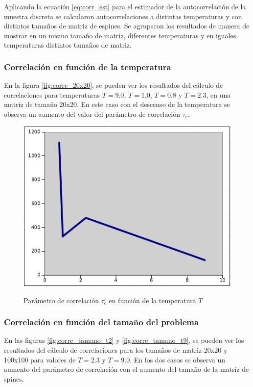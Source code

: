 \documentclass[a4paper,12pt]{article}
\begin{document}
Aplicando la ecuación  \ref{eq:corr_est}  para el estimador de la 
autocorrelación de la muestra discreta
se calcularon autocorrelaciones a distintas temperaturas y con distintos 
tamaños 
de matriz de espines. Se agruparon los resultados de manera de mostrar en un 
mismo
tamaño de matriz, diferentes temperaturas y en iguales temperaturas distintos 
tamaños de matriz.

\subsubsection{Correlación en función de la temperatura}

En la figura \ref{fig:corre_20x20}, se pueden ver los resultados del cálculo
de correlaciones para  temperaturas $T =9.0 $, $T = 1.0 $, $T =0.8 $ y $T = 2.3 
$, en una matriz de tamaño 20x20.
En este caso con el descenso de la temperatura se observa un aumento del valor 
del parámetro
de correlación $\tau_{c}$.


\begin{figure}[h]
   \begin{center}
        \includegraphics[scale=0.6]{corre_temperature.png} \\
        \caption{Parámetro de correlación  $\tau_{c}$ en función de la 
        temperatura $T$}\label{fig:corre_tempe}
    \end{center}
\end{figure}


\subsubsection{Correlación en función del tamaño del problema}
En las figuras \ref{fig:corre_tamano_t2} y \ref{fig:corre_tamano_t9}, se pueden 
ver los resultados del cálculo
de correlaciones para los tamaños de matriz 20x20 y 100x100 para valores de $T 
= 2.3$  y $T = 9.0$. 
En los dos casos se observa un aumento del parámetro de correlación con el 
aumento del 
tamaño de la matriz de spines.
\end{document}

